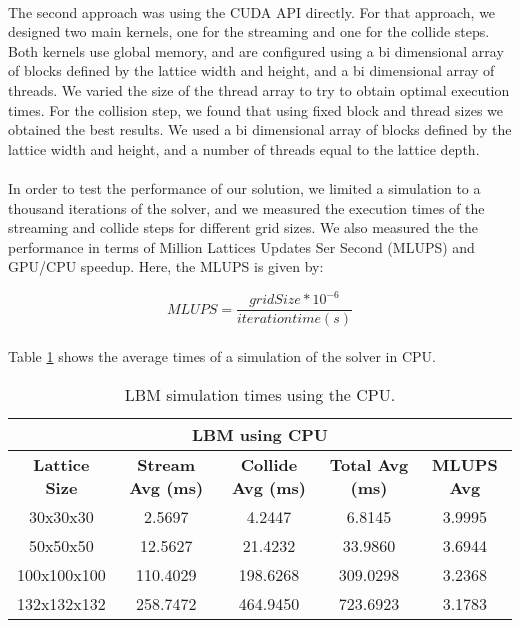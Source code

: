 \paragraph{} The second approach was using the CUDA API directly. For that approach, we designed two main kernels, one for the streaming and one for the collide steps. Both kernels use global memory, and are configured using a bi dimensional array of blocks defined by the lattice width and height, and a bi dimensional array of threads. We varied the size of the thread array to try to obtain optimal execution times. For the collision step, we found that using fixed block and thread sizes we obtained the best results. We used a bi dimensional array of blocks defined by the lattice width and height, and a number of threads equal to the lattice depth. 

\paragraph{}In order to test the performance of our solution, we limited a simulation to a thousand iterations of the solver, and we measured the execution times of the streaming and collide steps for different grid sizes. We also measured the the performance in terms of Million Lattices Updates Ser Second (MLUPS) and GPU/CPU speedup. Here, the MLUPS is given by:

\begin{equation}
	MLUPS = \frac{grid Size * 10^{-6}}{iteration time (s)}
\end{equation}

\paragraph{}Table \ref{tab:lbm_cpu} shows the average times of a simulation of the solver in CPU. 

\begin{table}[htbp]
  \centering
    \begin{tabular}{|c|c|c|c|c|}
    \toprule
    \multicolumn{5}{c}{\textbf{LBM using CPU}} \\
    \midrule
    \textbf{Lattice Size	} & \textbf{Stream Avg (ms)} &	 \textbf{Collide Avg (ms)} & \textbf{Total Avg (ms)} & \textbf{MLUPS Avg} \\ 
    30x30x30 & 	2.5697	 & 4.2447& 6.8145& 3.9995\\
    50x50x50&	12.5627&	21.4232&33.9860&3.6944\\
	100x100x100&110.4029&198.6268&309.0298&	3.2368\\
	132x132x132&	258.7472&464.9450&723.6923&3.1783\\
    \bottomrule
    \end{tabular}%
    \caption{LBM simulation times using the CPU.}
  \label{tab:lbm_cpu}%
\end{table}%

